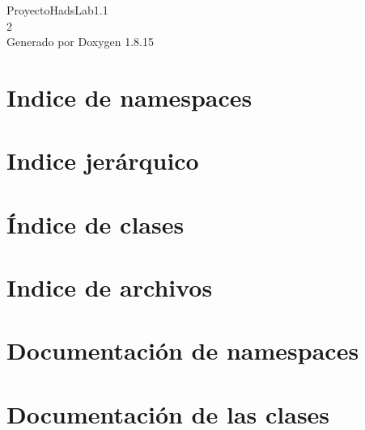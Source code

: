 \let\mypdfximage\pdfximage\def\pdfximage{\immediate\mypdfximage}\documentclass[twoside]{book}
\newcommand{\+}{\discretionary{\mbox{\scriptsize$\hookleftarrow$}}{}{}}
\newcommand{\clearemptydoublepage}{%
  \newpage{\pagestyle{empty}\cleardoublepage}%
}
\begin{document}
\hypersetup{pageanchor=false,
             bookmarksnumbered=true,
             pdfencoding=unicode
            }
\begin{titlepage}
\vspace*{7cm}
\begin{center}%
{\Large Proyecto\+Hads\+Lab1.1 \\[1ex]\large 2 }\\
\vspace*{1cm}
{\large Generado por Doxygen 1.8.15}\\
\end{center}
\end{titlepage}
\clearemptydoublepage
{}
\tableofcontents
\clearemptydoublepage
{}
\hypersetup{pageanchor=true}

\chapter{Indice de namespaces}

\chapter{Indice jerárquico}

\chapter{Índice de clases}

\chapter{Indice de archivos}

\chapter{Documentación de namespaces}





\chapter{Documentación de las clases}









\end{document}
